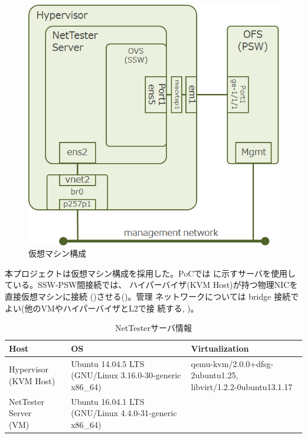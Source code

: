 \begin{figure}[h]
 \centering
 \includegraphics[scale=0.6]{img/nettester-deploy-vm.png}
 \caption{仮想マシン構成}
 \label{fig:nettester-deploy-vm}
\end{figure}

本プロジェクトは仮想マシン構成を採用した。PoCでは
に示すサーバを使用している。SSW-PSW間接続では、
ハイパーバイザ(KVM Host)が持つ物理NICを直接仮想マシンに接続
()させる()。管理
ネットワークについては bridge 接続でよい(他のVMやハイパーバイザとL2で接
続する, )。

\begin{table}[hb]
 \centering
 \caption{NetTesterサーバ情報}
 \label{tab:server-spec}
 \begin{tabularx}{\linewidth}{l|X|X}
  \hline
  Host & OS & Virtualization \\
  \hline
  \hline
  \shortstack[l]{Hypervisor\\(KVM Host)}
    & \shortstack[l]{Ubuntu 14.04.5 LTS\\(GNU/Linux 3.16.0-30-generic x86\_64)}
    & \shortstack[l]{qemu-kvm/2.0.0+dfsg-2ubuntu1.25,\\libvirt/1.2.2-0ubuntu13.1.17} \\
  \hline
  \shortstack[l]{NetTester Server\\(VM)}
    & \shortstack[l]{Ubuntu 16.04.1 LTS\\(GNU/Linux 4.4.0-31-generic x86\_64)}
    & \\
  \hline
 \end{tabularx}
\end{table}

